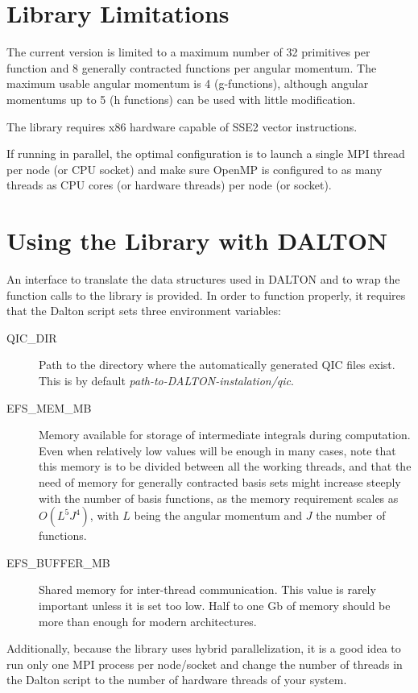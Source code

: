 \documentclass[a4paper,11pt]{paper}
\begin{document}
\section{Library Limitations}

The current version is limited to a maximum number of 32 primitives per function and 8 generally contracted functions per angular momentum. The maximum usable angular momentum is 4 (g-functions), although angular momentums up to 5 (h functions) can be used with little modification.

The library requires x86 hardware capable of SSE2 vector instructions.

If running in parallel, the optimal configuration is to launch a single MPI thread per node (or CPU socket) and make sure OpenMP is configured to as many threads as CPU cores (or hardware threads) per node (or socket).


\section{Using the Library with DALTON}

An interface to translate the data structures used in DALTON and to wrap the function calls to the library is provided. In order to function properly, it requires that the Dalton script sets three environment variables: \\    

\begin{description}
    \item[QIC\_DIR] Path to the directory where the automatically generated QIC files exist. This is by default {\it path-to-DALTON-instalation/qic}.
    \item[EFS\_MEM\_MB] Memory available for storage of intermediate integrals during computation. Even when relatively low values will be enough in many cases, note that this memory is to be divided between all the working threads, and that the need of memory for generally contracted basis sets might increase steeply with the number of basis functions, as the memory requirement scales as $O(L^5 J^4)$, with $L$ being the angular momentum and $J$ the number of functions.
    \item[EFS\_BUFFER\_MB] Shared memory for inter-thread communication. This value is rarely important unless it is set too low. Half to one Gb of memory should be more than enough for modern architectures.
\end{description}

Additionally, because the library uses hybrid parallelization, it is a good idea to run only one MPI process per node/socket and change the number of threads in the Dalton script to the number of hardware threads of your system.
\end{document}
